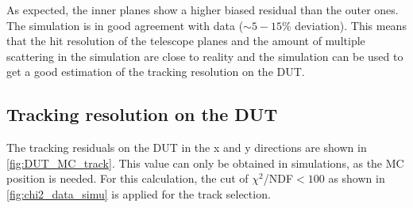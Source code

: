 As expected, the inner planes show a higher biased residual than the
outer ones. The simulation is in good agreement with data
($\sim5-15\%$ deviation). This means that the hit resolution of the
telescope planes and the amount of multiple scattering in the
simulation are close to reality and the simulation can be used to get
a good estimation of the tracking resolution on the DUT.




\subsection{Tracking resolution on the DUT}
\label{sec:TrackResOnDUT}

The tracking residuals on the DUT in the x and y directions are shown
in \cref{fig:DUT_MC_track}. This value can only be obtained in
simulations, as the MC position is needed. For this calculation, the
cut of $\chi^2$/NDF$<100$ as shown in \cref{fig:chi2_data_simu} is
applied for the track selection.

